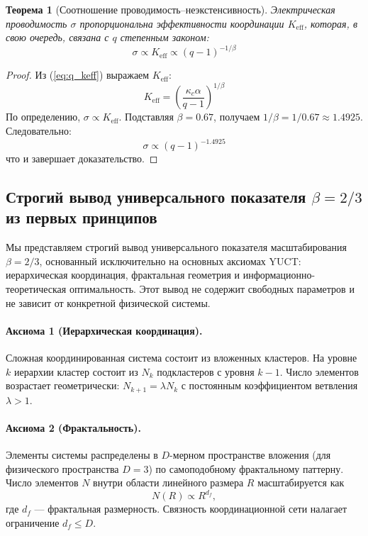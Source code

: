 \documentclass[12pt,a4paper]{article}
\newtheorem{theorem}{Теорема}[section]
\theoremstyle{remark}
\newcommand{\Ke}{K_{\mathrm{eff}}}
\newcommand{\kappac}{\kappa_c}
\newcommand{\alp}{\alpha}
\begin{document}
	\begin{theorem}[Соотношение проводимость–неэкстенсивность]
		Электрическая проводимость \(\sigma\) пропорциональна эффективности координации \(\Ke\), которая, в свою очередь, связана с \(q\) степенным законом:
		\begin{equation}
			\sigma \propto \Ke \propto (q-1)^{-1/\beta}
			\label{eq:sigma_q}
		\end{equation}
		\label{th:conductivity}
	\end{theorem}
	
	\begin{proof}
		Из (\ref{eq:q_keff}) выражаем \(\Ke\):
		\[
		\Ke = \left( \frac{\kappac \alp}{q-1} \right)^{1/\beta}
		\]
		По определению, \(\sigma \propto \Ke\). Подставляя \(\beta = 0.67\), получаем \(1/\beta = 1/0.67 \approx 1.4925\). Следовательно:
		\[
		\sigma \propto (q-1)^{-1.4925}
		\]
		что и завершает доказательство.
	\end{proof}
	
	\subsection{Строгий вывод универсального показателя \(\beta = 2/3\) из первых принципов}
	\label{subsec:beta_derivation}
	
	Мы представляем строгий вывод универсального показателя масштабирования \(\beta = 2/3\), основанный исключительно на основных аксиомах YUCT: иерархическая координация, фрактальная геометрия и информационно-теоретическая оптимальность. Этот вывод не содержит свободных параметров и не зависит от конкретной физической системы.
	
	\paragraph{Аксиома 1 (Иерархическая координация).}
	Сложная координированная система состоит из вложенных кластеров. На уровне \(k\) иерархии кластер состоит из \(N_k\) подкластеров с уровня \(k-1\). Число элементов возрастает геометрически: \(N_{k+1} = \lambda N_k\) с постоянным коэффициентом ветвления \(\lambda > 1\).
	
	\paragraph{Аксиома 2 (Фрактальность).}
	Элементы системы распределены в \(D\)-мерном пространстве вложения (для физического пространства \(D = 3\)) по самоподобному фрактальному паттерну. Число элементов \(N\) внутри области линейного размера \(R\) масштабируется как
	\begin{equation}
		N(R) \propto R^{d_f},
		\label{eq:fractal_dim}
	\end{equation}
	где \(d_f\) — фрактальная размерность. Связность координационной сети налагает ограничение \(d_f \le D\).
	
\end{document}
